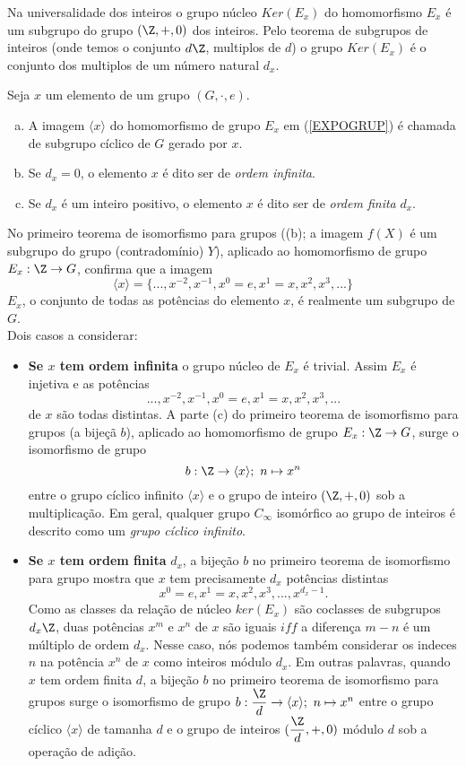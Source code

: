       Na universalidade dos inteiros o grupo núcleo $Ker(E_{x})$ do homomorfismo $E_{x}$ é um subgrupo do grupo $(\Z, +, 0)$ dos inteiros. Pelo teorema de subgrupos de inteiros (onde temos o conjunto $d\Z$, multiplos de $d$) o grupo $Ker(E_{x})$ é o conjunto dos multiplos de um número natural $d_{x}$.
      \begin{definition}
         Seja $x$ um elemento de um grupo $(G,\cdot,e)$.
         \begin{enumerate}[(a)]
            \item A imagem $\langle x \rangle$ do homomorfismo de grupo $E_{x}$ em (\ref{EXPOGRUP}) é chamada de subgrupo cíclico de $G$ gerado por $x$.
            \item Se $d_{x} = 0$, o elemento $x$ é dito ser de \emph{ordem infinita}.
            \item Se $d_{x}$ é um inteiro positivo, o elemento $x$ é dito ser de \emph{ordem finita} $d_{x}$.
         \end{enumerate}
      \end{definition}
      No primeiro teorema de isomorfismo para grupos ((b); a imagem $f(X)$ é um subgrupo do grupo (contradomínio) $Y$), aplicado ao homomorfismo de grupo $E_{x}: \Z \to G$, confirma que a imagem
      $$ \langle x \rangle = \{..., x^{-2} , x^{-1} , x^{0} = e, x^{1} = x, x^{2} , x^{3} , ...\}$$
      $E_{x}$, o conjunto de todas as potências do elemento $x$, é realmente um subgrupo de $G$.\\
      Dois casos a considerar:
      \begin{itemize}
         \item \textbf{Se $x$ tem ordem infinita} o grupo núcleo de $E_{x}$ é trivial. Assim $E_{x}$ é injetiva e as potências $$... , x^{-2} , x^{-1} , x^{0} = e , x^{1} = x , x^{2} , x^{3} , ... $$ de $x$ são todas distintas. A parte (c) do primeiro teorema de isomorfismo para grupos (a bijeçã $b$), aplicado ao homomorfismo de grupo $E_{x}: \Z \to G$, surge o isomorfismo de grupo $$b:\Z \to \langle x \rangle ;\ n \mapsto x^{n}$$ entre o grupo cíclico infinito $\langle x \rangle$ e o grupo de inteiro $(\Z, +, 0)$ sob a multiplicação. Em geral, qualquer grupo $C_{\infty}$ isomórfico ao grupo de inteiros é descrito como um \emph{grupo cíclico infinito}.
         \item \textbf{Se $x$ tem ordem finita} $d_{x}$, a bijeção $b$ no primeiro teorema de isomorfismo para grupo mostra que $x$ tem precisamente $d_{x}$ potências distintas $$x^{0} = e, x^{1} = x, x^{2}, x^{3}, ... , x^{d_{x}-1}.$$ Como as classes da relação de núcleo $ker(E_{x})$ são coclasses de subgrupos $d_{x}\Z$, duas potências $x^{m}$ e $x^{n}$ de $x$ são iguais $iff$ a diferença $m - n$ é um múltiplo de ordem $d_{x}$. Nesse caso, nós podemos também considerar os indeces $n$ na potência $x^{n}$ de $x$ como inteiros módulo $d_{x}$. Em outras palavras, quando $x$ tem ordem finita $d$, a bijeção $b$ no primeiro teorema de isomorfismo para grupos surge o isomorfismo de grupo $b: \dfrac{\Z}{d} \to \langle x \rangle;\ n \mapsto x^{n}$ entre o grupo cíclico $\langle x \rangle$ de tamanha $d$ e o grupo de inteiros $(\dfrac{\Z}{d}, +, 0)$ módulo $d$ sob a operação de adição.
      \end{itemize}
